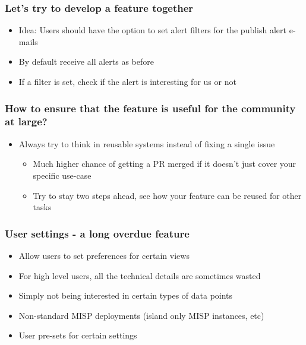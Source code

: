 
\begin{frame}
\titlepage
\end{frame}

\begin{frame}
  \frametitle{Let's try to develop a feature together}
  \begin{itemize}
    \item Idea: Users should have the option to set alert filters for the publish alert e-mails
    \item By default receive all alerts as before
    \item If a filter is set, check if the alert is interesting for us or not
  \end{itemize}
\end{frame}

\begin{frame}
  \frametitle{How to ensure that the feature is useful for the community at large?}
  \begin{itemize}
    \item Always try to think in reusable systems instead of fixing a single issue
    \begin{itemize}
      \item Much higher chance of getting a PR merged if it doesn't just cover your specific use-case
      \item Try to stay two steps ahead, see how your feature can be reused for other tasks
    \end{itemize}
  \end{itemize}
\end{frame}

\begin{frame}
  \frametitle{User settings - a long overdue feature}
  \begin{itemize}
    \item Allow users to set preferences for certain views
    \item For high level users, all the technical details are sometimes wasted
    \item Simply not being interested in certain types of data points
    \item Non-standard MISP deployments (island only MISP instances, etc)
    \item User pre-sets for certain settings  
  \end{itemize}
\end{frame}


